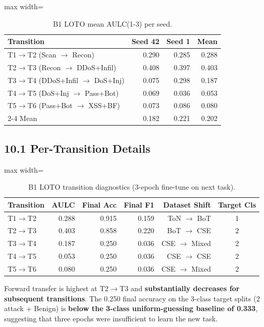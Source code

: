 \documentclass[11pt,a4paper]{article}
\begin{document}
\begin{table}[H]
\centering
\caption{B1 LOTO mean AULC(1-3) per seed.}
\label{tab:b1-loto}
\begin{adjustbox}{max width=\textwidth}
\begin{tabular}{lrrr}
\toprule
Transition & Seed 42 & Seed 1 & Mean \\
\midrule
T1$\to$T2 (Scan $\to$ Recon) & 0.290 & 0.285 & 0.288 \\
T2$\to$T3 (Recon $\to$ DDoS+Infil) & 0.408 & 0.397 & 0.403 \\
T3$\to$T4 (DDoS+Infil $\to$ DoS+Inj) & 0.075 & 0.298 & 0.187 \\
T4$\to$T5 (DoS+Inj $\to$ Pass+Bot) & 0.069 & 0.036 & 0.053 \\
T5$\to$T6 (Pass+Bot $\to$ XSS+BF) & 0.073 & 0.086 & 0.080 \\
\cmidrule{2-4}
Mean & 0.182 & 0.221 & 0.202 \\
\bottomrule
\end{tabular}
\end{adjustbox}
\end{table}

\subsection*{10.1 Per-Transition Details}

\begin{table}[H]
\centering
\caption{B1 LOTO transition diagnostics (3-epoch fine-tune on next task).}
\label{tab:b1-details}
\begin{adjustbox}{max width=\textwidth}
\begin{tabular}{lrrrrc}
\toprule
Transition & AULC & Final Acc & Final F1 & Dataset Shift & Target Cls \\
\midrule
T1$\to$T2 & 0.288 & 0.915 & 0.159 & ToN $\to$ BoT & 1 \\
T2$\to$T3 & 0.403 & 0.858 & 0.220 & BoT $\to$ CSE & 2 \\
T3$\to$T4 & 0.187 & 0.250 & 0.036 & CSE $\to$ Mixed & 2 \\
T4$\to$T5 & 0.053 & 0.250 & 0.036 & CSE $\to$ CSE & 2 \\
T5$\to$T6 & 0.080 & 0.250 & 0.036 & CSE $\to$ Mixed & 2 \\
\bottomrule
\end{tabular}
\end{adjustbox}
\end{table}

Forward transfer is highest at T2$\to$T3 and \textbf{substantially decreases for subsequent transitions}. The 0.250 final accuracy on the 3-class target splits (2 attack + Benign) is \textbf{below the 3-class uniform-guessing baseline of 0.333}, suggesting that three epochs were insufficient to learn the new task.
\end{document}
